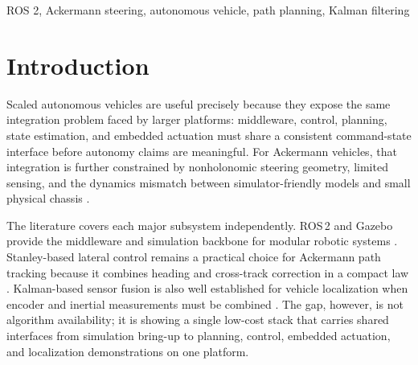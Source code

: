 \documentclass[conference]{IEEEtran}
\begin{document}
\begin{abstract}
Many scaled-vehicle projects stop at ROS bring-up, teleoperation, or isolated
localization experiments, leaving the full autonomy pipeline only partially
validated. This paper presents the final integrated stack we built for a
scaled Ackermann vehicle using ROS\,2 Jazzy, Gazebo Harmonic, Python planning
and control nodes, a Raspberry Pi~4 host, and a Raspberry Pi Pico-based
embedded actuation layer. The final system connects three structured track
scenarios to a shared planner, a feedforward-plus-PID longitudinal controller,
a Stanley-style lateral controller, and a linearized Kalman-filter localization node. In the
exported Milestone~5 simulation artifacts, with injected measurement noise of
$0.03$~m in position, $0.04$~rad in heading, $0.05$~m/s in speed, and
$0.08$~rad/s in yaw rate, the filter reduces position root-mean-square error
from $4.17$~cm to $0.71$~cm on the straight track and to $0.69$~cm on the
racing track, while heading root-mean-square error drops from $2.19^{\circ}$ to
$0.42^{\circ}$ in both cases. Hardware demonstrations confirm that the same
high-level pipeline can run headlessly on the physical platform for predefined
straight, obstacle-avoidance, and city-style tracks. The main limitation is
that the system is validated on known tracks with proprioceptive sensing only,
not in generalized obstacle-rich environments.
\end{abstract}

\begin{IEEEkeywords}
ROS 2, Ackermann steering, autonomous vehicle, path planning, Kalman filtering
\end{IEEEkeywords}

\section{Introduction}
\label{sec:intro}

Scaled autonomous vehicles are useful precisely because they expose the same
integration problem faced by larger platforms: middleware, control, planning,
state estimation, and embedded actuation must share a consistent command-state
interface before autonomy claims are meaningful. For Ackermann vehicles, that
integration is further constrained by nonholonomic steering geometry, limited
sensing, and the dynamics mismatch between simulator-friendly models and small
physical chassis \cite{ROS2JazzyDocs,GazeboHarmonicDocs,Xu2023}.

The literature covers each major subsystem independently. ROS\,2 and Gazebo
provide the middleware and simulation backbone for modular robotic systems
\cite{ROS2JazzyDocs,GazeboHarmonicDocs}. Stanley-based lateral control remains a
practical choice for Ackermann path tracking because it combines heading and
cross-track correction in a compact law \cite{Hoffmann2007}. Kalman-based sensor
fusion is also well established for vehicle localization when encoder and
inertial measurements must be combined \cite{Peiris2024,Georgiev2004}. The gap,
however, is not algorithm availability; it is showing a single low-cost stack
that carries shared interfaces from simulation bring-up to planning, control,
embedded actuation, and localization demonstrations on one platform.
\end{document}
